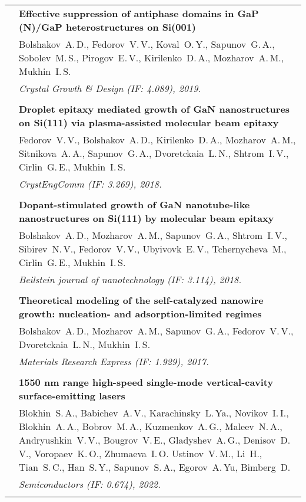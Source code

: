 \documentclass[letterpaper, 11pt]{article}
\begin{document}
\begin{longtable}{p{1.3in}p{4.8in}}
        & \textbf{Effective suppression of antiphase domains in GaP (N)/GaP
        heterostructures on Si(001)} \\
        & Bolshakov~A.\,D., Fedorov~V.\,V., Koval~O.\,Y., Sapunov~G.\,A.,
        Sobolev~M.\,S., Pirogov~E.\,V., Kirilenko~D.\,A., Mozharov~A.\,M.,
        Mukhin~I.\,S. \\
        & \textit{Crystal Growth \& Design (IF: 4.089), 2019.}\\
		& \\
		
        & \textbf{Droplet epitaxy mediated growth of GaN nanostructures on
        Si(111) via plasma-assisted molecular beam epitaxy} \\
        & Fedorov~V.\,V., Bolshakov~A.\,D., Kirilenko~D.\,A., Mozharov~A.\,M.,
        Sitnikova~A.\,A., Sapunov~G.\,A., Dvoretckaia~L.\,N., Shtrom~I.\,V.,
        Cirlin~G.\,E., Mukhin~I.\,S. \\
        & \textit{CrystEngComm (IF: 3.269), 2018.}\\
		& \\

        & \textbf{Dopant-stimulated growth of GaN nanotube-like nanostructures
        on Si(111) by molecular beam epitaxy} \\
        & Bolshakov~A.\,D., Mozharov~A.\,M., Sapunov~G.\,A., Shtrom~I.\,V.,
        Sibirev~N.\,V., Fedorov~V.\,V., Ubyivovk~E.\,V., Tchernycheva~M.,
        Cirlin~G.\,E., Mukhin~I.\,S. \\
        & \textit{Beilstein journal of nanotechnology (IF: 3.114), 2018.}\\
		& \\

		\nohyphens{\color{OliveGreen}{Q2 Publications}}
        & \textbf{Theoretical modeling of the self-catalyzed nanowire growth:
        nucleation- and adsorption-limited regimes} \\
        & Bolshakov~A.\,D., Mozharov~A.\,M., Sapunov~G.\,A., Fedorov~V.\,V.,
        Dvoretckaia~L.\,N., Mukhin~I.\,S. \\
        & \textit{Materials Research Express (IF: 1.929), 2017.}\\
		& \\

		\nohyphens{\color{OliveGreen}{Q3 Publications}}
        & \textbf{1550 nm range high-speed single-mode vertical-cavity
        surface-emitting lasers} \\
        & Blokhin~S.\,A., Babichev~A.\,V., Karachinsky~L.\,Ya., Novikov~I.\,I.,
        Blokhin~A.\,A., Bobrov~M.\,A., Kuzmenkov~A.\,G., Maleev~N.\,A.,
        Andryushkin~V.\,V., Bougrov~V.\,E., Gladyshev~A.\,G., Denisov~D.\,V.,
        Voropaev~K.\,O., Zhumaeva~I.\,O. Ustinov~V.\,M., Li~H., Tian~S.\,C.,
        Han~S.\,Y., Sapunov~S.\,A., Egorov~A.\,Yu, Bimberg~D. \\
		& \textit{Semiconductors (IF: 0.674), 2022.}\\
		& \\


\end{longtable}
\end{document}
